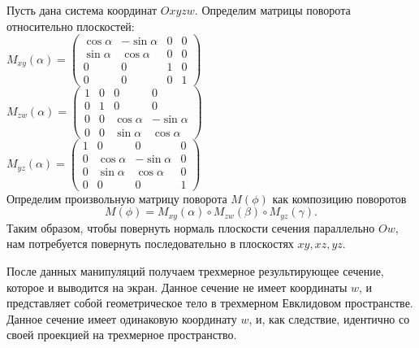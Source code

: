 \documentclass[12pt, a4paper, twoside]{report}
\begin{document}
Пусть дана система координат $Oxyzw$. Определим матрицы поворота относительно плоскостей:
\\

$
M_{xy}(\alpha)=
\begin{equation}
	\left(
		\begin{array}{cccc}
		\cos \alpha & -\sin \alpha & 0 & 0 \\
		\sin \alpha & \cos \alpha & 0 & 0 \\
		0 & 0 & 1 & 0 \\
		0 & 0 & 0 & 1
	\end{array}\right)
\end{equation}
$
\\ 

$
M_{zw}(\alpha)=
\begin{equation}
	\left(
		\begin{array}{cccc}
		1 & 0 & 0 & 0 \\
		0 & 1 & 0 & 0 \\
		0 & 0 & \cos \alpha & -\sin \alpha \\
		0 & 0 & \sin \alpha & \cos \alpha
	\end{array}\right)
\end{equation}
$
\\

$
M_{yz}(\alpha)=
\begin{equation}
	\left(
		\begin{array}{cccc}
		1 & 0 & 0 & 0 \\
		0 & \cos \alpha & -\sin \alpha & 0 \\
		0 & \sin \alpha & \cos \alpha & 0 \\
		0 & 0 & 0 & 1
	\end{array}\right)
\end{equation}
$
\\

Определим произвольную матрицу поворота $M(\phi)$ как композицию поворотов $$M(\phi)=M_{xy}(\alpha)\circ M_{zw}(\beta)\circ M_{yz}(\gamma).$$
Таким образом, чтобы повернуть нормаль плоскости сечения параллельно $Ow$, нам потребуется повернуть последовательно в плоскостях $xy, xz, yz$.

После данных манипуляций получаем трехмерное результирующее сечение, которое и выводится на экран. Данное сечение не имеет координаты $w$, и представляет собой геометрическое тело в трехмерном Евклидовом пространстве.
Данное сечение имеет одинаковую координату $w$, и, как следствие, идентично со своей проекцией на трехмерное пространство.
\newpage
\end{document}
